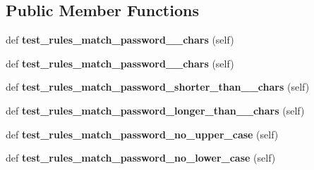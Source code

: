 \subsection*{Public Member Functions}
\begin{DoxyCompactItemize}
\item 
\mbox{\label{classtests_1_1test__14__auth__module_1_1_test_user_routes_a2c5ce53bee834172baded7c4285b9f02}} 
def {\bfseries test\+\_\+rules\+\_\+match\+\_\+password\+\_\+\_\+chars} (self)
\item 
\mbox{\label{classtests_1_1test__14__auth__module_1_1_test_user_routes_a1e82d98ea1c6ea82aeb4f3c5911bdde0}} 
def {\bfseries test\+\_\+rules\+\_\+match\+\_\+password\+\_\+\_\+chars} (self)
\item 
\mbox{\label{classtests_1_1test__14__auth__module_1_1_test_user_routes_a16f4daee022812a90d03b22ae4c58ce3}} 
def {\bfseries test\+\_\+rules\+\_\+match\+\_\+password\+\_\+shorter\+\_\+than\+\_\+\_\+chars} (self)
\item 
\mbox{\label{classtests_1_1test__14__auth__module_1_1_test_user_routes_a340ef42617a0f25e7baa57dd53eb5a1d}} 
def {\bfseries test\+\_\+rules\+\_\+match\+\_\+password\+\_\+longer\+\_\+than\+\_\+\_\+chars} (self)
\item 
\mbox{\label{classtests_1_1test__14__auth__module_1_1_test_user_routes_a143f5b1c95a32c9f6e0f5c5cc860d95c}} 
def {\bfseries test\+\_\+rules\+\_\+match\+\_\+password\+\_\+no\+\_\+upper\+\_\+case} (self)
\item 
\mbox{\label{classtests_1_1test__14__auth__module_1_1_test_user_routes_abab4bc0cfed62396eaeafde0cd356de9}} 
def {\bfseries test\+\_\+rules\+\_\+match\+\_\+password\+\_\+no\+\_\+lower\+\_\+case} (self)
\item 
\mbox{\label{classtests_1_1test__14__auth__module_1_1_test_user_routes_a82b3088d06ee8d136f707961c7c866d8}} 

\end{DoxyCompactItemize}
